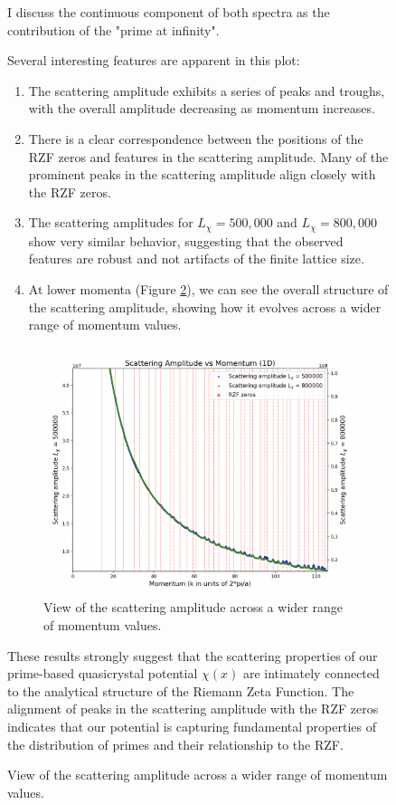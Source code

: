 \documentclass[11pt, oneside]{article}
\begin{document}
\begin{figure}[htbp]
\begin{center}
I discuss the continuous component of both spectra as the contribution of the "prime at infinity".

Several interesting features are apparent in this plot:

\begin{enumerate}
    \item The scattering amplitude exhibits a series of peaks and troughs, with the overall amplitude decreasing as momentum increases.
    \item There is a clear correspondence between the positions of the RZF zeros and features in the scattering amplitude. Many of the prominent peaks in the scattering amplitude align closely with the RZF zeros.
    \item The scattering amplitudes for $L_\chi = 500,000$ and $L_\chi = 800,000$ show very similar behavior, suggesting that the observed features are robust and not artifacts of the finite lattice size.
    \item At lower momenta (Figure \ref{fig:scattering_amplitude_large}), we can see the overall structure of the scattering amplitude, showing how it evolves across a wider range of momentum values.
\end{enumerate}

\begin{figure}[htbp]
\begin{center}
    \includegraphics[width=0.8\linewidth]{../images/large_scattering.png}
\caption{View of the scattering amplitude across a wider range of momentum values.}
\label{fig:scattering_amplitude_large}
\end{center}
\end{figure}

These results strongly suggest that the scattering properties of our prime-based quasicrystal potential $\chi(x)$ are intimately connected to the analytical structure of the Riemann Zeta Function. The alignment of peaks in the scattering amplitude with the RZF zeros indicates that our potential is capturing fundamental properties of the distribution of primes and their relationship to the RZF.


\end{center}
\end{figure}
\end{document}
